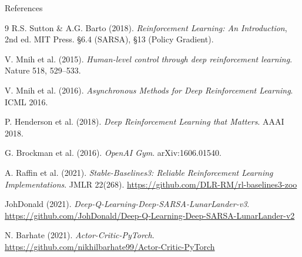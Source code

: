 \documentclass[aspectratio=169, 10pt]{beamer}
\begin{document}
\begin{frame}{References}
  \small
  \begin{thebibliography}{9}
      R.S. Sutton \& A.G. Barto (2018).
      \emph{Reinforcement Learning: An Introduction}, 2nd ed.
      MIT Press. \S6.4 (SARSA), \S13 (Policy Gradient).

      V. Mnih et al. (2015).
      \emph{Human-level control through deep reinforcement learning}.
      Nature 518, 529--533.

      V. Mnih et al. (2016).
      \emph{Asynchronous Methods for Deep Reinforcement Learning}.
      ICML 2016.

      P. Henderson et al. (2018).
      \emph{Deep Reinforcement Learning that Matters}.
      AAAI 2018.

      G. Brockman et al. (2016).
      \emph{OpenAI Gym}. arXiv:1606.01540.

      A. Raffin et al. (2021).
      \emph{Stable-Baselines3: Reliable Reinforcement Learning Implementations}.
      JMLR 22(268).
      \url{https://github.com/DLR-RM/rl-baselines3-zoo}

      JohDonald (2021).
      \emph{Deep-Q-Learning-Deep-SARSA-LunarLander-v3}.
      \url{https://github.com/JohDonald/Deep-Q-Learning-Deep-SARSA-LunarLander-v2}

      N. Barhate (2021).
      \emph{Actor-Critic-PyTorch}.
      \url{https://github.com/nikhilbarhate99/Actor-Critic-PyTorch}
  \end{thebibliography}
\end{frame}

\end{document}
